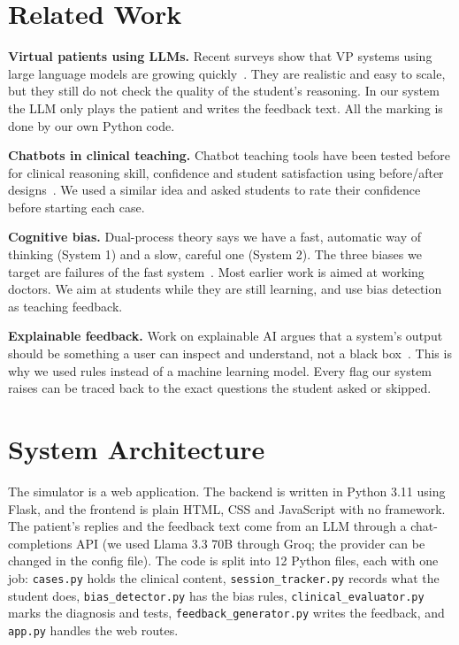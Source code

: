 \documentclass[conference]{IEEEtran}
\begin{document}
\section{Related Work}
\textbf{Virtual patients using LLMs.}
Recent surveys show that VP systems using large language models are growing
quickly~\cite{vpsurvey}. They are realistic and easy to scale, but they still do
not check the quality of the student's reasoning. In our system the LLM only
plays the patient and writes the feedback text. All the marking is done by our
own Python code.

\textbf{Chatbots in clinical teaching.}
Chatbot teaching tools have been tested before for clinical reasoning skill,
confidence and student satisfaction using before/after
designs~\cite{nursingchatbot}. We used a similar idea and asked students to rate
their confidence before starting each case.

\textbf{Cognitive bias.}
Dual-process theory says we have a fast, automatic way of thinking (System 1)
and a slow, careful one (System 2). The three biases we target are failures of
the fast system~\cite{greengrass2026, norman2010}. Most earlier work is aimed at
working doctors. We aim at students while they are still learning, and use bias
detection as teaching feedback.

\textbf{Explainable feedback.}
Work on explainable AI argues that a system's output should be something a user
can inspect and understand, not a black box~\cite{explainable}. This is why we
used rules instead of a machine learning model. Every flag our system raises can
be traced back to the exact questions the student asked or skipped.

\section{System Architecture}
The simulator is a web application. The backend is written in Python 3.11 using
Flask, and the frontend is plain HTML, CSS and JavaScript with no framework. The
patient's replies and the feedback text come from an LLM through a
chat-completions API (we used Llama 3.3 70B through Groq; the provider can be
changed in the config file). The code is split into 12 Python files, each with
one job: \texttt{cases.py} holds the clinical content,
\texttt{session\_tracker.py} records what the student does,
\texttt{bias\_detector.py} has the bias rules, \texttt{clinical\_evaluator.py}
marks the diagnosis and tests, \texttt{feedback\_generator.py} writes the
feedback, and \texttt{app.py} handles the web routes.
\end{document}
